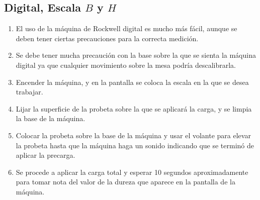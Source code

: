 \documentclass[a4paper,12pt]{report}
\begin{document}
\subsection{Digital, Escala $B$ y $H$}
\begin{enumerate}
\item El uso de la máquina de Rockwell digital es mucho más fácil, aunque se deben tener ciertas precauciones para la correcta medición.
\item Se debe tener mucha precaución con la base sobre la que se sienta la máquina digital ya que cualquier movimiento sobre la mesa podría descalibrarla.
\item Encender la máquina, y en la pantalla se coloca la escala en la que se desea trabajar.
\item Lijar la superficie de la probeta sobre la que se aplicará la carga, y se limpia la base de la máquina.
\item Colocar la probeta sobre la base de la máquina y usar el volante para elevar la probeta hasta que la máquina haga un sonido indicando que se terminó de aplicar la precarga.
\item Se procede a aplicar la carga total y esperar 10 segundos aproximadamente para tomar nota del valor de la dureza que aparece en la pantalla de la máquina.
\end{enumerate}
\end{document}

